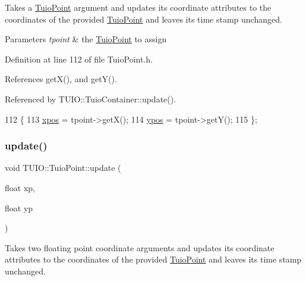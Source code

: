 Takes a \hyperlink{class_t_u_i_o_1_1_tuio_point}{Tuio\+Point} argument and updates its coordinate attributes to the coordinates of the provided \hyperlink{class_t_u_i_o_1_1_tuio_point}{Tuio\+Point} and leaves its time stamp unchanged.


\begin{DoxyParams}{Parameters}
{\em tpoint} & the \hyperlink{class_t_u_i_o_1_1_tuio_point}{Tuio\+Point} to assign \\
\hline
\end{DoxyParams}


Definition at line 112 of file Tuio\+Point.\+h.



References get\+X(), and get\+Y().



Referenced by T\+U\+I\+O\+::\+Tuio\+Container\+::update().


\begin{DoxyCode}
112                                         \{
113             \hyperlink{class_t_u_i_o_1_1_tuio_point_a0021f8dfddd05f2a17e713a94f5457e6}{xpos} = tpoint->getX();
114             \hyperlink{class_t_u_i_o_1_1_tuio_point_a89a038775a681166168735dbc95c7779}{ypos} = tpoint->getY();
115         \};
\end{DoxyCode}
\mbox{\label{class_t_u_i_o_1_1_tuio_point_a469e531b2847c58aa77486c0ccc15ce6}} 
\subsubsection{\texorpdfstring{update()}{update()}\hspace{0.1cm}{\footnotesize\ttfamily [2/3]}}
{\footnotesize\ttfamily void T\+U\+I\+O\+::\+Tuio\+Point\+::update (\begin{DoxyParamCaption}\item[{float}]{xp,  }\item[{float}]{yp }\end{DoxyParamCaption})\hspace{0.3cm}{\ttfamily [inline]}}

Takes two floating point coordinate arguments and updates its coordinate attributes to the coordinates of the provided \hyperlink{class_t_u_i_o_1_1_tuio_point}{Tuio\+Point} and leaves its time stamp unchanged.


